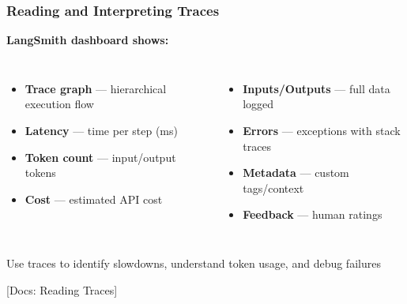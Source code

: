 \documentclass[aspectratio=169,11pt]{beamer}
\newcommand{\docref}[1]{{\scriptsize\color{docgray}[Docs: #1]}}
\begin{document}
\begin{frame}
  \frametitle{Reading and Interpreting Traces}

  \begin{center}
    \textbf{LangSmith dashboard shows:}
  \end{center}

  \vspace{0.15cm}

  \begin{columns}[T]
    \begin{itemize}
    \setlength{\itemsep}{1pt}
      \item \textbf{Trace graph} — hierarchical execution flow
      \item \textbf{Latency} — time per step (ms)
      \item \textbf{Token count} — input/output tokens
      \item \textbf{Cost} — estimated API cost
    \end{itemize}

    \begin{itemize}
    \setlength{\itemsep}{1pt}
      \item \textbf{Inputs/Outputs} — full data logged
      \item \textbf{Errors} — exceptions with stack traces
      \item \textbf{Metadata} — custom tags/context
      \item \textbf{Feedback} — human ratings
    \end{itemize}
  \end{columns}

  \vspace{0.2cm}

  \begin{tipbox}
    Use traces to identify slowdowns, understand token usage, and debug failures
  \end{tipbox}

  \docref{Reading Traces}
\end{frame}

\end{document}
